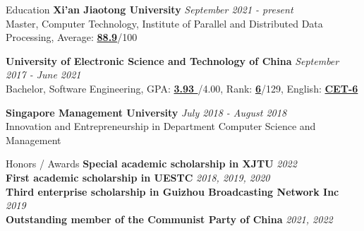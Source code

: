 \documentclass{resume} %
\begin{document}

\begin{rSection}{Education}
{\textbf{Xi'an Jiaotong University}} \hfill {\em September 2021 - present} \\ 
Master, Computer Technology, Institute of Parallel and Distributed Data Processing, Average: \textbf{\underline{88.9}}/100

{\textbf{University of Electronic Science and Technology of China}} \hfill {\em September 2017 - June 2021} \\
Bachelor, Software Engineering, GPA: \textbf{\underline{ 3.93 }}/4.00, Rank: \textbf{\underline{6}}/129, English: \textbf{\underline{CET-6}}

{\textbf{Singapore Management University}} \hfill {\em July 2018 - August 2018} \\ 
Innovation and Entrepreneurship in Department Computer Science and Management

\end{rSection}


\begin{rSection}{Honors / Awards}
    {\textbf{Special academic scholarship in XJTU}} \hfill {\em 2022} \\
    {\textbf{First academic scholarship in UESTC}} \hfill {\em 2018, 2019, 2020} \\
    {\textbf{Third enterprise scholarship in Guizhou Broadcasting Network Inc}} \hfill {\em 2019} \\
    {\textbf{Outstanding member of the Communist Party of China}} \hfill {\em 2021, 2022}
\end{rSection}


\end{document}
